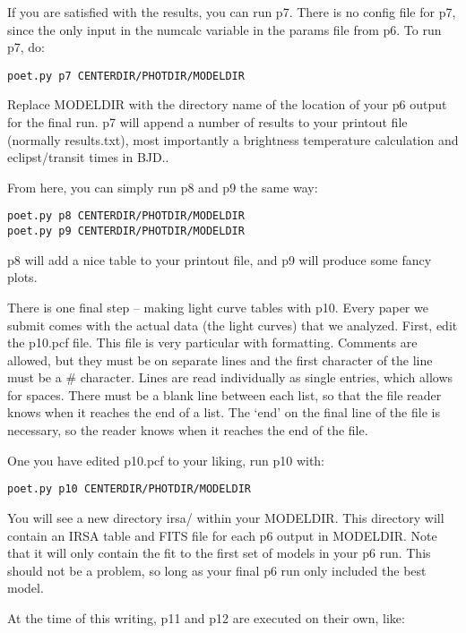 \documentclass[letterpaper,12pt]{article}
\begin{document}
If you are satisfied with the results, you can run p7. There is no
config file for p7, since the only input in the numcalc variable in
the params file from p6. To run p7, do:

\begin{verbatim}
poet.py p7 CENTERDIR/PHOTDIR/MODELDIR
\end{verbatim}

Replace MODELDIR with the directory name of the location of your p6 output
for the final run. p7 will append a number of results to your printout file
(normally results.txt), most importantly a brightness temperature
calculation and eclipst/transit times in BJD..

From here, you can simply run p8 and p9 the same way:

\begin{verbatim}
poet.py p8 CENTERDIR/PHOTDIR/MODELDIR
poet.py p9 CENTERDIR/PHOTDIR/MODELDIR
\end{verbatim}

p8 will add a nice table to your printout file, and p9 will produce some
fancy plots.

There is one final step -- making light curve tables with p10. Every
paper we submit comes with the actual data (the light curves) that we
analyzed. First, edit the p10.pcf file. This file is very particular
with formatting. Comments are allowed, but they must be on separate
lines and the first character of the line must be a \# character.
Lines are read individually as single entries, which allows for spaces.
There must be a blank line between each list, so that the file reader
knows when it reaches the end of a list. The `end' on the final line
of the file is necessary, so the reader knows when it reaches
the end of the file.

One you have edited p10.pcf to your liking, run p10 with:

\begin{verbatim}
poet.py p10 CENTERDIR/PHOTDIR/MODELDIR
\end{verbatim}

You will see a new directory irsa/ within your MODELDIR. This
directory will contain an IRSA table and FITS file for each
p6 output in MODELDIR. Note that it will only contain the fit
to the first set of models in your p6 run. This should not be a
problem, so long as your final p6 run only included the best
model.

At the time of this writing, p11 and p12 are executed on their own,
like:
\end{document}

